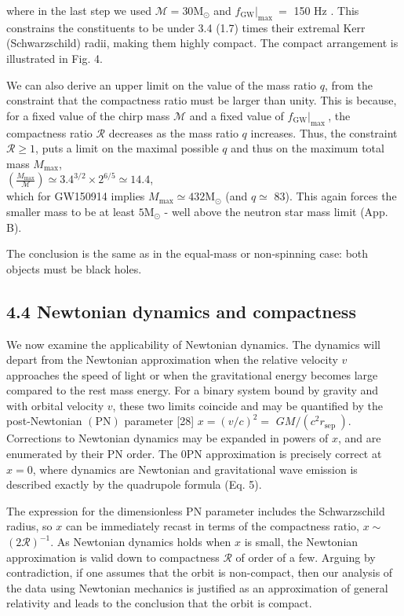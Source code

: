 \documentclass[10pt]{article}
\begin{document}
where in the last step we used $\mathscr{M}=30 \mathrm{M}_{\odot}$ and $\left.f_{\mathrm{GW}}\right|_{\text {max }}=$ 150 Hz . This constrains the constituents to be under 3.4 (1.7) times their extremal Kerr (Schwarzschild) radii, making them highly compact. The compact arrangement is illustrated in Fig. 4.

We can also derive an upper limit on the value of the mass ratio $q$, from the constraint that the compactness ratio must be larger than unity. This is because, for a fixed value of the chirp mass $\mathscr{M}$ and a fixed value of $\left.f_{\mathrm{GW}}\right|_{\text {max }}$, the compactness ratio $\mathscr{R}$ decreases as the mass ratio $q$ increases. Thus, the constraint $\mathscr{R} \geq 1$, puts a limit on the maximal possible $q$ and thus on the maximum total mass $M_{\max }$,\\
$\left(\frac{M_{\max }}{\mathscr{M}}\right) \simeq 3.4^{3 / 2} \times 2^{6 / 5} \simeq 14.4$,\\
which for GW150914 implies $M_{\max } \simeq 432 \mathrm{M}_{\odot}$ (and $q \simeq$ 83). This again forces the smaller mass to be at least $5 \mathrm{M}_{\odot}$ - well above the neutron star mass limit (App. B).

The conclusion is the same as in the equal-mass or non-spinning case: both objects must be black holes.

\subsection*{4.4 Newtonian dynamics and compactness}
We now examine the applicability of Newtonian dynamics. The dynamics will depart from the Newtonian approximation when the relative velocity $v$ approaches the speed of light or when the gravitational energy becomes large compared to the rest mass energy. For a binary system bound by gravity and with orbital velocity $v$, these two limits coincide and may be quantified by the post-Newtonian $(\mathrm{PN})$ parameter [28] $x=(v / c)^{2}=$ $G M /\left(c^{2} r_{\text {sep }}\right)$. Corrections to Newtonian dynamics may be expanded in powers of $x$, and are enumerated by their PN order. The 0PN approximation is precisely correct at $x=0$, where dynamics are Newtonian and gravitational wave emission is described exactly by the quadrupole formula (Eq. 5).

The expression for the dimensionless PN parameter includes the Schwarzschild radius, so $x$ can be immediately recast in terms of the compactness ratio, $x \sim$ $(2 \mathscr{R})^{-1}$. As Newtonian dynamics holds when $x$ is small, the Newtonian approximation is valid down to compactness $\mathscr{R}$ of order of a few. Arguing by contradiction, if one assumes that the orbit is non-compact, then our analysis of the data using Newtonian mechanics is justified as an approximation of general relativity and leads to the conclusion that the orbit is compact.
\end{document}
